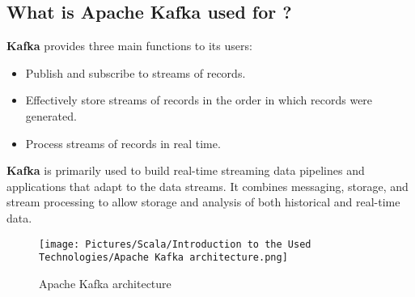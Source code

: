 \begin{spacing}{1.5}
\subsection{What is Apache Kafka used for ?}
\par \textbf{Kafka} provides three main functions to its users:
\begin{itemize}
   \item Publish and subscribe to streams of records.\vspace{.25cm}
   \item Effectively store streams of records in the order in which records were generated.\vspace{.25cm}
   \item Process streams of records in real time.\vspace{.25cm}
\end{itemize}   

\par \textbf{Kafka} is primarily used to build real-time streaming data pipelines and applications that adapt to the data streams. It combines messaging, storage, and stream processing to allow storage and analysis of both historical and real-time data.\\

\begin{figure}[!htb] 
\begin{center} 
\texttt{[image: Pictures/Scala/Introduction to the Used Technologies/Apache Kafka architecture.png]}
\end{center} 
\caption{Apache Kafka architecture} 
\end{figure}  \FloatBarrier
\\

\newpage


  
\end{spacing}

\makeatletter
\renewcommand{\thesubsection}{\@arabic\c@subsection}
\makeatother
